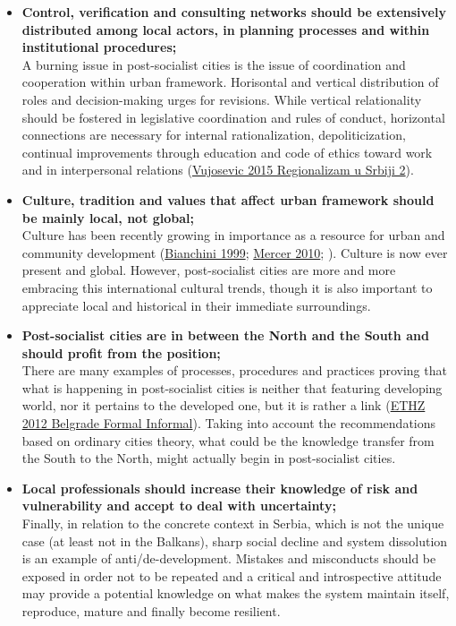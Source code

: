 \documentclass[11pt]{report}
\begin{document}
{\begin{itemize}
\item \textbf{Control, verification and consulting networks should be extensively distributed among local actors, in planning processes and within institutional procedures;}
\\
A burning issue in post-socialist cities is the issue of coordination and cooperation within urban framework.
Horisontal and vertical distribution of roles and decision-making urges for revisions.
While vertical relationality should be fostered in legislative coordination and rules of conduct, horizontal connections are necessary for internal rationalization, depoliticization, continual improvements through education and code of ethics toward work and in interpersonal relations (\href{}{Vujosevic 2015 Regionalizam u Srbiji 2}).
     
\item \textbf{Culture, tradition and values that affect urban framework should be mainly local, not global;}
\\
Culture has been recently growing in importance as a resource for urban  and  community development (\href{}{Bianchini 1999}; \href{}{Mercer 2010}; \cite{Volic et al. 2012}).
Culture is now ever present and global. 
However, post-socialist cities are more and more embracing this international cultural trends, though it is also important to appreciate local and historical in their immediate surroundings.

\item \textbf{Post-socialist cities are in between the North and the South and should profit from the position;}
\\
There are many examples of processes, procedures and practices proving that what is happening in post-socialist cities is neither that featuring developing world, nor it pertains to the developed one, but it is rather a link (\href{}{ETHZ 2012 Belgrade Formal Informal}).
Taking into account the recommendations based on ordinary cities theory, what could be the knowledge transfer from the South to the North, might actually begin in post-socialist cities.

\item {\textbf{Local professionals should increase their knowledge of risk and vulnerability and accept to deal with uncertainty;}}
\\
Finally, in relation to the concrete context in Serbia, which is not the unique case (at least not in the Balkans), sharp social decline and system dissolution is an example of anti/de-development.
Mistakes and misconducts should be exposed in order not to be repeated and a critical and introspective attitude may provide a potential knowledge on what makes the system maintain itself, reproduce, mature and finally become resilient.
\end{itemize}

}
\end{document}
